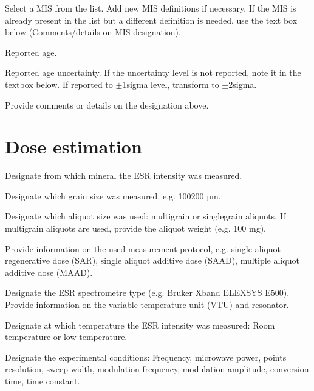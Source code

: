 \documentclass[letterpaper,10pt,english]{sphinxmanual}
\begin{document}
 \sphinxhyphen{} Select a MIS from the list. Add new MIS definitions if necessary. If the MIS is already present in the list but a different definition is needed, use the text box below (Comments/details on MIS designation).

 \sphinxhyphen{} Reported age.

 \sphinxhyphen{} Reported age uncertainty. If the uncertainty level is not reported, note it in the textbox below. If reported to \(\pm\)1\sphinxhyphen{}sigma level, transform to \(\pm\)2\sphinxhyphen{}sigma.

 \sphinxhyphen{} Provide comments or details on the designation above.


\section{Dose estimation}
\label{\detokenize{ESR:dose-estimation}}
 \sphinxhyphen{} Designate from which mineral the ESR intensity was measured.

 \sphinxhyphen{} Designate which grain size was measured, e.g. 100\sphinxhyphen{}200 µm.

 \sphinxhyphen{} Designate which aliquot size was used: multi\sphinxhyphen{}grain or single\sphinxhyphen{}grain aliquots. If multi\sphinxhyphen{}grain aliquots are used, provide the aliquot weight (e.g. 100 mg).

 \sphinxhyphen{} Provide information on the used measurement protocol, e.g. single aliquot regenerative dose (SAR), single aliquot additive dose (SAAD), multiple aliquot additive dose (MAAD).

 \sphinxhyphen{} Designate the ESR spectrometre type (e.g. Bruker X\sphinxhyphen{}band ELEXSYS E500). Provide information on the variable temperature unit (VTU) and resonator.

 \sphinxhyphen{} Designate at which temperature the ESR intensity was measured: Room temperature or low temperature.

 \sphinxhyphen{} Designate the experimental conditions: Frequency, microwave power, points resolution, sweep width, modulation frequency, modulation amplitude, conversion time, time constant.
\end{document}
